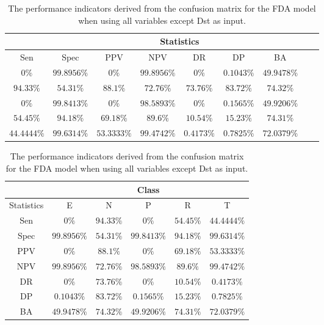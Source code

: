 \begin{table}[!ht]
	\centering
	\begin{tabular}{|c|c|c|c|c|c|c|c|c|}
		\hline
		 & \multicolumn{7}{c|}{Statistics} \\ \hline
		Sen & Spec & PPV & NPV & DR & DP & BA \\ \hline
		$0\%$ & $99.8956\%$ & $0\%$ & $99.8956\%$ & $0\%$ & $0.1043\%$ & $49.9478\%$ \\ \hline
		$94.33\%$ & $54.31\%$ & $88.1\%$ & $72.76\%$ & $73.76\%$ & $83.72\%$ & $74.32\%$ \\ \hline
		$0\%$ & $99.8413\%$ & $0\%$ & $98.5893\%$ & $0\%$ & $0.1565\%$ & $49.9206\%$ \\ \hline
		$54.45\%$ & $94.18\%$ & $69.18\%$ & $89.6\%$ & $10.54\%$ & $15.23\%$ & $74.31\%$ \\ \hline
		$44.4444\%$ & $99.6314\%$ & $53.3333\%$ & $99.4742\%$ & $0.4173\%$ & $0.7825\%$ & $72.0379\%$ \\ \hline
	\end{tabular}
	\caption{The performance indicators derived from the confusion matrix for the FDA model when using all variables except Dst as input.}
	\label{tab:cs:noDst:fda}
\end{table}

\begin{table}[!ht]
	\centering
	\begin{tabular}{|c|c|c|c|c|c|}
		\hline
		 & \multicolumn{5}{c|}{Class} \\ \hline
		Statistics & E & N & P & R & T \\ \hline
		Sen & $0\%$ & $94.33\%$ & $0\%$ & $54.45\%$ & $44.4444\%$ \\ \hline
		Spec & $99.8956\%$ & $54.31\%$ & $99.8413\%$ & $94.18\%$ & $99.6314\%$ \\ \hline
		PPV & $0\%$ & $88.1\%$ & $0\%$ & $69.18\%$ & $53.3333\%$ \\ \hline
		NPV & $99.8956\%$ & $72.76\%$ & $98.5893\%$ & $89.6\%$ & $99.4742\%$ \\ \hline
		DR & $0\%$ & $73.76\%$ & $0\%$ & $10.54\%$ & $0.4173\%$ \\ \hline
		DP & $0.1043\%$ & $83.72\%$ & $0.1565\%$ & $15.23\%$ & $0.7825\%$ \\ \hline
		BA & $49.9478\%$ & $74.32\%$ & $49.9206\%$ & $74.31\%$ & $72.0379\%$ \\ \hline
	\end{tabular}
	\caption{The performance indicators derived from the confusion matrix for the FDA model when using all variables except Dst as input.}
	\label{tab:cs:reverse:noDst:fda}
\end{table}

